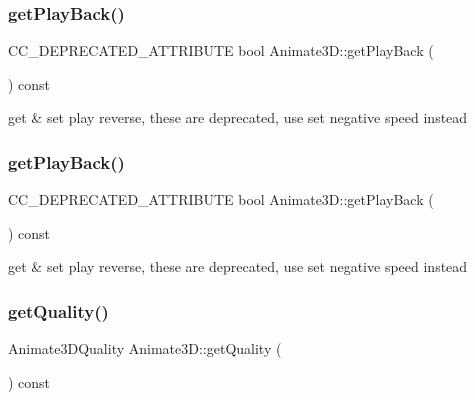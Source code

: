 \subsubsection{\texorpdfstring{get\+Play\+Back()}{getPlayBack()}\hspace{0.1cm}{\footnotesize\ttfamily [1/2]}}
{\footnotesize\ttfamily C\+C\+\_\+\+D\+E\+P\+R\+E\+C\+A\+T\+E\+D\+\_\+\+A\+T\+T\+R\+I\+B\+U\+TE bool Animate3\+D\+::get\+Play\+Back (\begin{DoxyParamCaption}{ }\end{DoxyParamCaption}) const\hspace{0.3cm}{\ttfamily [inline]}}

get \& set play reverse, these are deprecated, use set negative speed instead \mbox{\label{classAnimate3D_ac9ca6671172132e1e29ceeb810df4ba4}} 
\subsubsection{\texorpdfstring{get\+Play\+Back()}{getPlayBack()}\hspace{0.1cm}{\footnotesize\ttfamily [2/2]}}
{\footnotesize\ttfamily C\+C\+\_\+\+D\+E\+P\+R\+E\+C\+A\+T\+E\+D\+\_\+\+A\+T\+T\+R\+I\+B\+U\+TE bool Animate3\+D\+::get\+Play\+Back (\begin{DoxyParamCaption}{ }\end{DoxyParamCaption}) const\hspace{0.3cm}{\ttfamily [inline]}}

get \& set play reverse, these are deprecated, use set negative speed instead \mbox{\label{classAnimate3D_af9e4be0cb5896579154c7dd971315914}} 
\subsubsection{\texorpdfstring{get\+Quality()}{getQuality()}\hspace{0.1cm}{\footnotesize\ttfamily [1/2]}}
{\footnotesize\ttfamily Animate3\+D\+Quality Animate3\+D\+::get\+Quality (\begin{DoxyParamCaption}{ }\end{DoxyParamCaption}) const}

